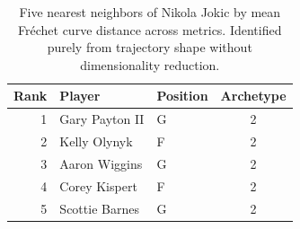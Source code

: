 \begin{table}[htbp]
  \centering\small
  \begin{tabular}{rllc}
    \toprule
    Rank & Player & Position & Archetype \\
    \midrule
    1 & Gary Payton II & G & 2 \\
    2 & Kelly Olynyk & F & 2 \\
    3 & Aaron Wiggins & G & 2 \\
    4 & Corey Kispert & F & 2 \\
    5 & Scottie Barnes & G & 2 \\
    \bottomrule
  \end{tabular}
  \caption{Five nearest neighbors of Nikola Jokic by mean Fr\'{e}chet curve distance across metrics. Identified purely from trajectory shape without dimensionality reduction.}
  \label{tab:Nikola_Jokic_frechet_curve_neighbors}
\end{table}

